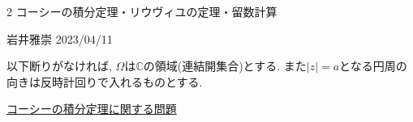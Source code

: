 \documentclass[dvipdfmx,a4paper,11pt]{article}
\newcommand{\C}{\mathbb{C}}
\theoremstyle{definition}
\begin{document}

\begin{center}
{\Large 2 コーシーの積分定理・リウヴィユの定理・留数計算}
\end{center}

\begin{flushright}
 岩井雅崇 2023/04/11
\end{flushright}
以下断りがなければ, $\Omega$は$\C$の領域(連結開集合)とする.
また$|z|=a$となる円周の向きは反時計回りで入れるものとする. 

\vspace{12pt}
\hspace{-24pt}\underline{コーシーの積分定理に関する問題}
\end{document}

